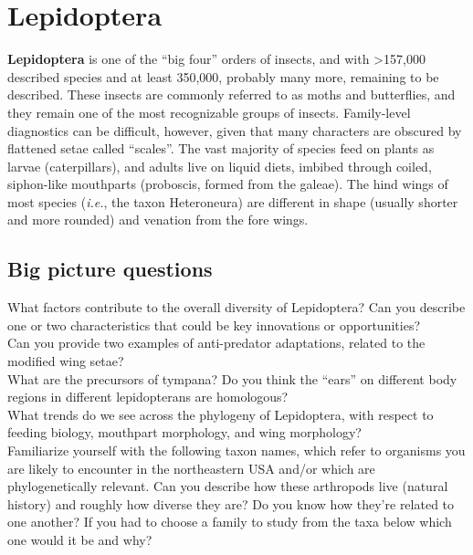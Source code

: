 \documentclass[letterpaper, 11pt]{article}
\begin{document}
\section{Lepidoptera}

\noindent{}\textbf{Lepidoptera} is one of the ``big four'' orders of insects, and with \textgreater157,000 described species and at least 350,000, probably many more, remaining to be described. These insects are commonly referred to as moths and butterflies, and they remain one of the most recognizable groups of insects. Family-level diagnostics can be difficult, however, given that many characters are obscured by flattened setae called ``scales''. The vast majority of species feed on plants as larvae (caterpillars), and adults live on liquid diets, imbibed through coiled, siphon-like mouthparts (proboscis, formed from the galeae). The hind wings of most species (\textit{i.e.}, the taxon Heteroneura) are different in shape (usually shorter and more rounded) and venation from the fore wings.

\subsection*{Big picture questions}
\noindent{}What factors contribute to the overall diversity of Lepidoptera? Can you describe one or two characteristics that could be key innovations or opportunities? \\


\noindent{}Can you provide  two examples of anti-predator adaptations, related to the modified wing setae? \\

\noindent{}What are the precursors of tympana? Do you think the ``ears'' on different body regions in different lepidopterans are homologous? \\ 

\noindent{}What trends do we see across the phylogeny of Lepidoptera, with respect to feeding biology, mouthpart morphology, and wing morphology? \\

\noindent{}Familiarize yourself with the following taxon names, which refer to organisms you are likely to encounter in the northeastern USA and/or which are phylogenetically relevant. Can you describe how these arthropods live (natural history) and roughly how diverse they are? Do you know how they're related to one another? If you had to choose a family to study from the taxa below which one would it be and why?
\end{document}
